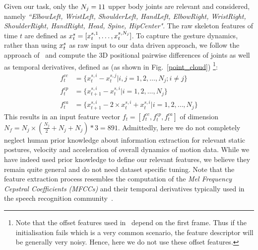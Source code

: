 Given our task, only  the $N_j=11$ upper body joints are relevant and 
considered, namely \emph{``ElbowLeft, WristLeft, ShoulderLeft, HandLeft, ElbowRight, WristRight, ShoulderRight, HandRight, Head, Spine, HipCenter"}.
%
The raw skeleton features of time $t$ are defined as $x^s_t=[x_t^{s,1}, \ldots, x_t^{s, N_j}]$. 
To capture the gesture dynamics, rather than using $x^s_t$ as raw input to our data driven approach, 
we follow the approach of~\cite{diwucvpr14} and compute the 3D positional pairwise differences of joints as well as temporal derivatives, defined as (as shown in Fig.~\ref{point_cloud}) \footnote{Note that the offset features used in~\cite{diwucvpr14} depend on the first frame.
Thus if the initialisation fails which is a very common scenario, the feature descriptor will be generally very noisy. 
Hence, here we do not use these offset features.}:
\begin{align}
f^{cc}_t&=\{x_t^{s,i}-x_t^{s,j} | i,j=1,2,\ldots, N_j; i\neq j\} \label{sk_features_1}\\
f^{cp}_t&=\{x_{t+1}^{s,i}-x_t^{s,i} |  i=1,2,\ldots, N_j\} \label{sk_features_2}\\
f^{ca}_t&=\{x_{t+1}^{s,i} - 2 \times x_t^{s,i} + x_t^{s,i} | i=1,2,\ldots, N_j  \} \label{sk_features_3}
\end{align}
%
This results in an input feature vector $f_t=[f^{cc}_t, f^{cp}_t, f^{ca}_t]$ of dimension $N_f=N_j \times( \frac{ N_j}{2} + N_j + N_j)*\mathit{3}=891$.
Admittedly, here we do not completely neglect human prior knowledge about information extraction for relevant static postures, velocity and acceleration of overall dynamics of motion data.
While we have indeed used prior knowledge to define our relevant features, we believe they remain quite general and do not need dataset specific tuning.
Note that the feature extraction process resembles the computation of the 
\emph{Mel Frequency Cepstral Coefficients (MFCCs)} and their temporal derivatives 
typically used in the  speech recognition community~\cite{mohamed2012acoustic}.

